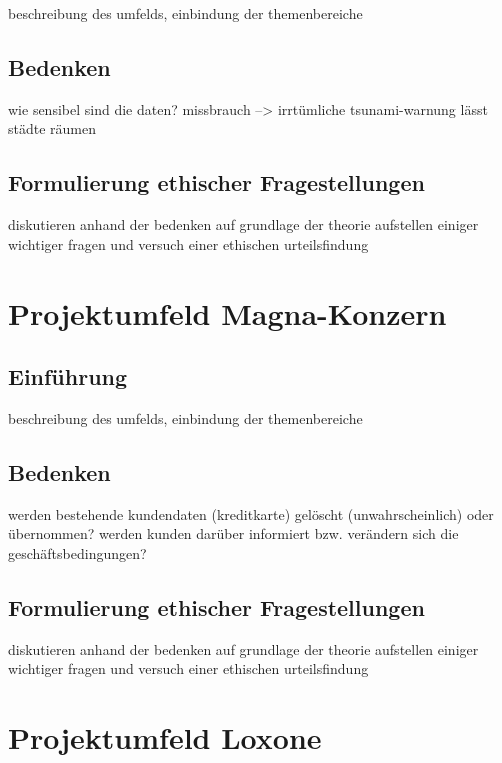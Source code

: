 \documentclass[letterpaper, 12pt]{article}
\let\tempsection\section
\renewcommand\section[1]{\vspace{-0.3cm}\tempsection{#1}\vspace{-0.3cm}}
\let\tempsubsection\subsection
\renewcommand\subsection[1]{\vspace{0cm}\tempsubsection{#1}\vspace{0cm}}
\begin{document}
beschreibung des umfelds, einbindung der themenbereiche

\subsection{Bedenken}

wie sensibel sind die daten? missbrauch --> irrtümliche tsunami-warnung lässt städte räumen

\subsection{Formulierung ethischer Fragestellungen}

diskutieren anhand der bedenken auf grundlage der theorie \newline
aufstellen einiger wichtiger fragen und versuch einer ethischen urteilsfindung

\clearpage

\section{Projektumfeld Magna-Konzern}

\subsection{Einführung}
beschreibung des umfelds, einbindung der themenbereiche

\subsection{Bedenken}

werden bestehende kundendaten (kreditkarte) gelöscht (unwahrscheinlich) oder übernommen? werden kunden darüber informiert bzw. verändern sich die geschäftsbedingungen?

\subsection{Formulierung ethischer Fragestellungen}

diskutieren anhand der bedenken auf grundlage der theorie \newline
aufstellen einiger wichtiger fragen und versuch einer ethischen urteilsfindung

\clearpage

\section{Projektumfeld Loxone}
\end{document}
